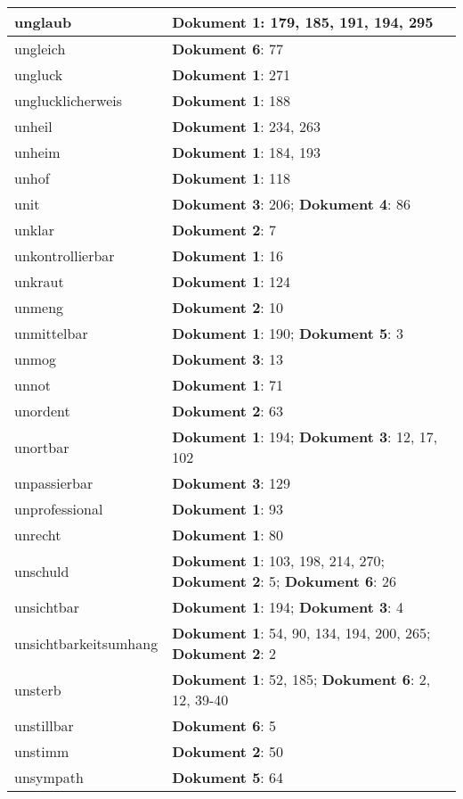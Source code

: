 \documentclass[a5paper]{article}
\begin{document}
\begin{longtable}[l]{|l|p{3in}|}
\hline
unglaub & \textbf{Dokument 1}: 179, 185, 191, 194, 295 \\
\hline
ungleich & \textbf{Dokument 6}: 77 \\
\hline
ungluck & \textbf{Dokument 1}: 271 \\
\hline
unglucklicherweis & \textbf{Dokument 1}: 188 \\
\hline
unheil & \textbf{Dokument 1}: 234, 263 \\
\hline
unheim & \textbf{Dokument 1}: 184, 193 \\
\hline
unhof & \textbf{Dokument 1}: 118 \\
\hline
unit & \textbf{Dokument 3}: 206; \textbf{Dokument 4}: 86 \\
\hline
unklar & \textbf{Dokument 2}: 7 \\
\hline
unkontrollierbar & \textbf{Dokument 1}: 16 \\
\hline
unkraut & \textbf{Dokument 1}: 124 \\
\hline
unmeng & \textbf{Dokument 2}: 10 \\
\hline
unmittelbar & \textbf{Dokument 1}: 190; \textbf{Dokument 5}: 3 \\
\hline
unmog & \textbf{Dokument 3}: 13 \\
\hline
unnot & \textbf{Dokument 1}: 71 \\
\hline
unordent & \textbf{Dokument 2}: 63 \\
\hline
unortbar & \textbf{Dokument 1}: 194; \textbf{Dokument 3}: 12, 17, 102 \\
\hline
unpassierbar & \textbf{Dokument 3}: 129 \\
\hline
unprofessional & \textbf{Dokument 1}: 93 \\
\hline
unrecht & \textbf{Dokument 1}: 80 \\
\hline
unschuld & \textbf{Dokument 1}: 103, 198, 214, 270; \textbf{Dokument 2}: 5; \textbf{Dokument 6}: 26 \\
\hline
unsichtbar & \textbf{Dokument 1}: 194; \textbf{Dokument 3}: 4 \\
\hline
unsichtbarkeitsumhang & \textbf{Dokument 1}: 54, 90, 134, 194, 200, 265; \textbf{Dokument 2}: 2 \\
\hline
unsterb & \textbf{Dokument 1}: 52, 185; \textbf{Dokument 6}: 2, 12, 39-40 \\
\hline
unstillbar & \textbf{Dokument 6}: 5 \\
\hline
unstimm & \textbf{Dokument 2}: 50 \\
\hline
unsympath & \textbf{Dokument 5}: 64 \\

\end{longtable}
\end{document}
